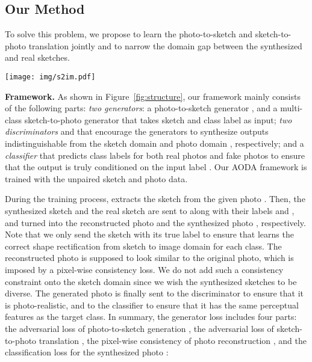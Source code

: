 \documentclass[10pt,twocolumn,letterpaper]{article}
\begin{document}
\subsection{Our Method}
\label{sec:method_strategy}
To solve this problem, we propose to learn the photo-to-sketch and sketch-to-photo translation jointly and to narrow the domain gap between the synthesized and real sketches.

\begin{figure*}[tbp]
\centering
    \texttt{[image: img/s2im.pdf]}
\caption{AODA framework overview. It has two generators  and  conditioned on the input label, and two discriminators  and  for the sketch and photo domains, respectively. In addition, we use a photo classifier  to encourage  to generate indistinguishable photos from the real ones of the same class.}
    \label{fig:structure}
\end{figure*}

\noindent \textbf{Framework.} As shown in Figure~\ref{fig:structure}, our framework mainly consists of the following parts: \textit{two generators}: a photo-to-sketch generator , and a multi-class sketch-to-photo generator  that takes sketch  and class label  as input; \textit{two discriminators}  and  that encourage the generators to synthesize outputs indistinguishable from the sketch domain  and photo domain , respectively; and a \textit{classifier } that predicts class labels for both real photos  and fake photos  to ensure that the output is truly conditioned on the input label . Our AODA framework is trained with the unpaired sketch and photo data.

During the training process,  extracts the sketch  from the given photo . Then, the synthesized sketch  and the real sketch  are sent to  along with their labels  and , and turned into the reconstructed photo  and the synthesized photo , respectively. Note that we only send the sketch with its true label to ensure that  learns the correct shape rectification from sketch to image domain for each class. The reconstructed photo is supposed to look similar to the original photo, which is imposed by a pixel-wise consistency loss. We do not add such a consistency constraint onto the sketch domain since we wish the synthesized sketches to be diverse. The generated photo is finally sent to the discriminator  to ensure that it is photo-realistic, and to the classifier  to ensure that it has the same perceptual features as the target class. In summary, the generator loss includes four parts: the adversarial loss of photo-to-sketch generation , the adversarial loss of sketch-to-photo translation , the pixel-wise consistency of photo reconstruction , and the classification loss for the synthesized photo :
\end{document}
